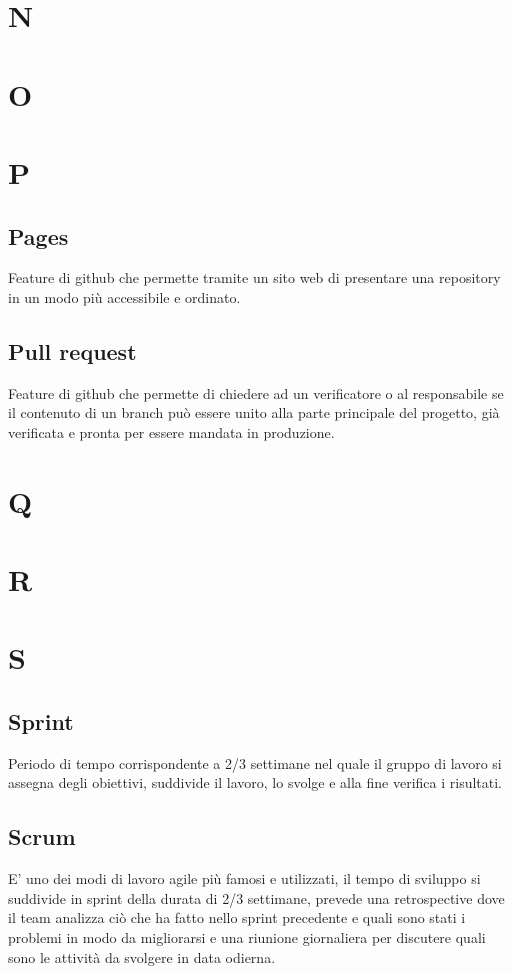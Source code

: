 \section{N}
\section{O}
\section{P}
    \subsection{Pages}
    Feature di github che permette tramite un sito web di presentare una repository in un modo più accessibile e ordinato.
    \subsection{Pull request}
    Feature di github che permette di chiedere ad un verificatore o al responsabile se il contenuto di un branch può
    essere unito alla parte principale del progetto, già verificata e pronta per essere mandata in produzione.

\section{Q}
\section{R}
\section{S}
    \subsection{Sprint}
    Periodo di tempo corrispondente a 2/3 settimane nel quale il gruppo di lavoro si assegna degli 
    obiettivi, suddivide il lavoro, lo svolge e alla fine verifica i risultati.
    \subsection{Scrum}
    E' uno dei modi di lavoro agile più famosi e utilizzati, il tempo di sviluppo si suddivide in sprint della durata di 2/3 settimane,
    prevede una retrospective dove il team analizza ciò che ha fatto nello sprint precedente e quali sono stati i problemi in modo da migliorarsi
    e una riunione giornaliera per discutere quali sono le attività da svolgere in data odierna.

